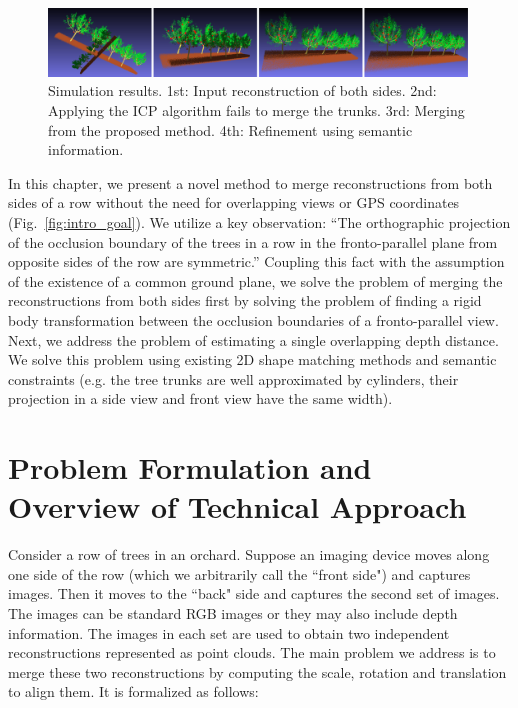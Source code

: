 \begin{figure}[!htbp]
        \centering
            \includegraphics[width =0.99\textwidth]{figures/merge_both/Simulation_Compare.pdf}           
   \caption[Failure of Iterative Closest Point (ICP) method to merge reconstructions]{Simulation results. 1st: Input reconstruction of both sides. 2nd: Applying the ICP algorithm fails to merge the trunks. 3rd: Merging from the proposed method. 4th: Refinement using semantic information.}
   \label{fig:Simulation_Compare}
\end{figure}
In this chapter, we present a novel method to merge reconstructions from both sides of a row without the need for overlapping views or GPS coordinates (Fig.~\ref{fig:intro_goal}). We utilize a key observation: ``The orthographic projection of the occlusion boundary of the trees in a row in the fronto-parallel plane from opposite sides of the row are symmetric.'' Coupling this fact with the assumption of the existence of a common ground plane, we solve the problem of merging the reconstructions from both sides first by solving the problem of finding a rigid body transformation between the occlusion boundaries of a fronto-parallel view. Next, we address the problem of estimating a single overlapping depth distance. We solve this problem using existing 2D shape matching methods and semantic constraints (e.g. the tree trunks are well approximated by cylinders, their projection in a side view and front view have the same width).

\section{Problem Formulation and Overview of Technical Approach}\label{sec:techoverview}


Consider a row of trees in an orchard. Suppose an imaging device moves along one side of the row  (which we arbitrarily call the ``front side") and captures images. Then it moves to the ``back" side and captures the second set of images.  The images can be standard RGB images or they may also include depth information. The images in each set are used to obtain two independent reconstructions represented as point clouds. 
The main problem we address is to merge these two reconstructions by computing the scale, rotation and translation to align them. It is  formalized as follows:


